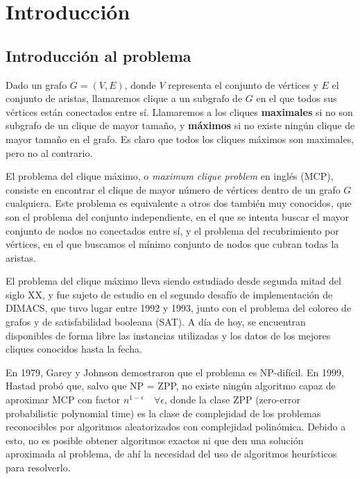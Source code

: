 \chapter{Introducción}\label{ch:introduccionMCP}

\section{Introducción al problema}

Dado un grafo $G = (V, E)$, donde $V$ representa el conjunto de vértices
y $E$ el conjunto de aristas, llamaremos clique a un subgrafo de $G$
en el que todos sus vértices están conectados entre sí. Llamaremos a los
cliques \textbf{maximales} si no son subgrafo de un clique de mayor tamaño,
y \textbf{máximos} si no existe ningún clique de mayor tamaño en el grafo.
Es claro que todos los cliques máximos son maximales, pero no al contrario.

El problema del clique máximo, o \textit{maximum clique problem} en inglés (MCP),
consiste en encontrar el clique de mayor número de vértices dentro de un
grafo $G$ cualquiera. Este problema es equivalente a otros dos también muy conocidos,
que son el problema del conjunto independiente, en el que se intenta buscar el mayor
conjunto de nodos no conectados entre sí, y el problema del recubrimiento por vértices,
en el que buscamos el mínimo conjunto de nodos que cubran todas la aristas.

El problema del clique máximo lleva siendo estudiado desde segunda mitad del siglo XX, y fue sujeto
de estudio en el segundo desafío de implementación de DIMACS, que tuvo lugar entre 1992
y 1993, junto con el problema del coloreo de grafos y de satisfabilidad booleana (SAT).
A día de hoy, se encuentran disponibles de forma libre las instancias utilizadas y los
datos de los mejores cliques conocidos hasta la fecha.

En 1979, Garey y Johnson \citep{garey:1979} demostraron que el problema es NP-difícil.
En 1999, Hastad \citep{hastad:1999} probó que, salvo que NP = ZPP, no existe ningún
algoritmo capaz de aproximar MCP con factor $n^{1-\epsilon} \quad \forall \epsilon$,
donde la clase ZPP (zero-error probabilistic polynomial time) es la clase de complejidad
de los problemas reconocibles por algoritmos aleatorizados con complejidad polinómica.
Debido a esto, no es posible obtener algoritmos exactos ni que den una solución
aproximada al problema, de ahí la necesidad del uso de algoritmos heurísticos para
resolverlo.

